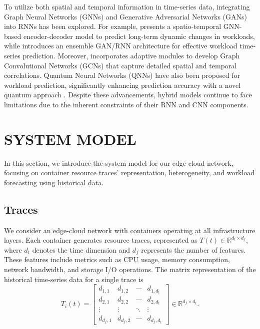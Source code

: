 \documentclass{ieeetmlcn}
\begin{document}
To utilize both spatial and temporal information in time-series data, integrating Graph Neural Networks (GNNs) and Generative Adversarial Networks (GANs) into RNNs has been explored. For example, \cite{li2024evogwp} presents a spatio-temporal GNN-based encoder-decoder model to predict long-term dynamic changes in workloads, while \cite{RNNGAN} introduces an ensemble GAN/RNN architecture for effective workload time-series prediction. Moreover, \cite{AGCRN} incorporates adaptive modules to develop Graph Convolutional Networks (GCNs) that capture detailed spatial and temporal correlations. Quantum Neural Networks (QNNs) have also been proposed for workload prediction, significantly enhancing prediction accuracy with a novel quantum approach \cite{10531701}. Despite these advancements, hybrid models continue to face limitations due to the inherent constraints of their RNN and CNN components.


\section{SYSTEM MODEL}
\label{sec: System Model}

In this section, we introduce the system model for our edge-cloud network, focusing on container resource traces' representation, heterogeneity, and workload forecasting using historical data.

\subsection{Traces}

We consider an edge-cloud network with containers operating at all infrastructure layers. Each container generates resource traces, represented as $T(t) \in \mathbb{R}^{d_t \times d_f}$, where $d_t$ denotes the time dimension and $d_f$ represents the number of features. These features include metrics such as CPU usage, memory consumption, network bandwidth, and storage I/O operations. The matrix representation of the historical time-series data for a single trace is
\begin{equation}
T_i(t) = \begin{bmatrix}
d_{1,1} & d_{1,2} & \cdots & d_{1,d_t} \\
d_{2,1} & d_{2,2} & \cdots & d_{2,d_t} \\
\vdots & \vdots & \ddots & \vdots \\
d_{d_f,1} & d_{d_f,2} & \cdots & d_{d_f,d_t} 
\end{bmatrix} \in \mathbb{R}^{d_f \times d_t}.
\end{equation}
\end{document}
